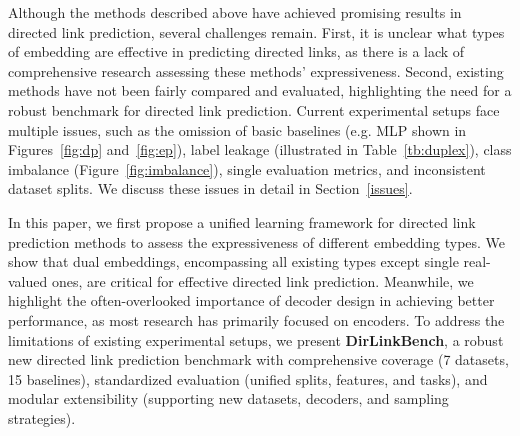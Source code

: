 
Although the methods described above have achieved promising results in directed link prediction, several challenges remain. 
First, it is unclear what types of embedding are effective in predicting directed links, as there is a lack of comprehensive research assessing these methods' expressiveness.
Second, existing methods have not been fairly compared and evaluated, highlighting the need for a robust benchmark for directed link prediction. Current experimental setups face multiple issues, such as the omission of basic baselines (e.g. MLP shown in Figures~\ref{fig:dp} and~\ref{fig:ep}),  label leakage (illustrated in Table~\ref{tb:duplex}), class imbalance (Figure~\ref{fig:imbalance}), single evaluation metrics, and inconsistent dataset splits. We discuss these issues in detail in Section~\ref{issues}.








In this paper, we first propose a unified learning framework for directed link prediction methods to assess the expressiveness of different embedding types. We show that dual embeddings, encompassing all existing types except single real-valued ones, are critical for effective directed link prediction. Meanwhile, we highlight the often-overlooked importance of decoder design in achieving better performance, as most research has primarily focused on encoders. To address the limitations of existing experimental setups, we present \textbf{DirLinkBench}, a robust new directed link prediction benchmark with comprehensive coverage (7 datasets, 15 baselines), standardized evaluation (unified splits, features, and tasks), and modular extensibility (supporting new datasets, decoders, and sampling strategies).

